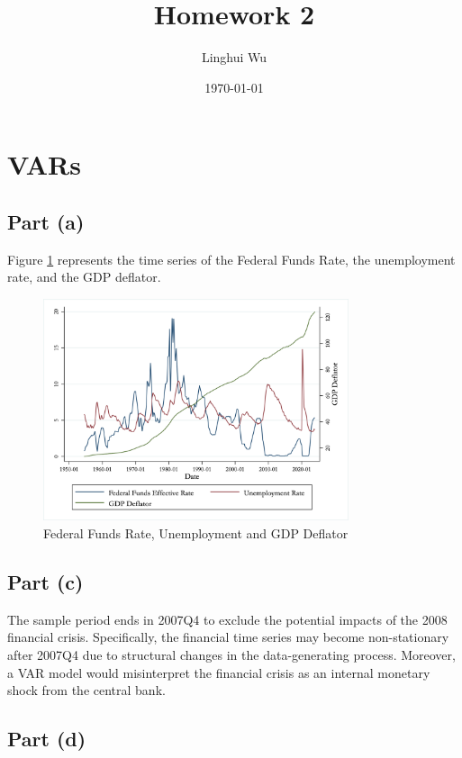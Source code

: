\documentclass[12pt]{article}
\title{
Homework 2
}
\author{Linghui Wu}
\date{\today}
\begin{document}
\maketitle

\section{VARs}

\subsection*{Part (a)} 

Figure \ref{fig:time_series} represents the time series of the Federal Funds Rate, the unemployment rate, and the GDP deflator.

\begin{figure}[ht]
    \centering
    \includegraphics[width=0.8\textwidth]{figs/time_series.png}
    \caption{Federal Funds Rate, Unemployment and GDP Deflator}
    \label{fig:time_series}
\end{figure}

\subsection*{Part (c)} 

The sample period ends in 2007Q4 to exclude the potential impacts of the 2008 financial crisis. 
Specifically, the financial time series may become non-stationary after 2007Q4 due to structural changes in the data-generating process.
Moreover, a VAR model would misinterpret the financial crisis as an internal monetary shock from the central bank. 

\subsection*{Part (d)} 
\end{document}
